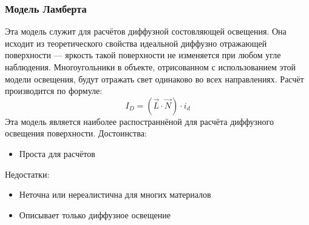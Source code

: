 \documentclass[a4paper,12pt]{report}
\numberwithin{equation}{section}
\begin{document}
\subsubsection*{Модель Ламберта}
Эта модель служит для расчётов диффузной состовляющей освещения. Она исходит из теоретического свойства идеальной диффузно отражающей поверхности --- яркость такой поверхности не изменяется при любом угле наблюдения. Многоугольники в объекте, отрисованном с использованием этой модели освещения, будут отражать свет одинаково во всех направлениях. Расчёт производится по формуле:
\begin{equation}
I_D = (\vec{L} \cdot \vec{N}) \cdot i_d
\end{equation}
Эта модель является наиболее распостраннёной для расчёта диффузного освещения поверхности.
Достоинства:
\begin{itemize}
\item Проста для расчётов
\end{itemize}
Недостатки:
\begin{itemize}
\item Неточна или нереалистична для многих материалов
\item Описывает только диффузное освещение
\end{itemize}
\end{document}
